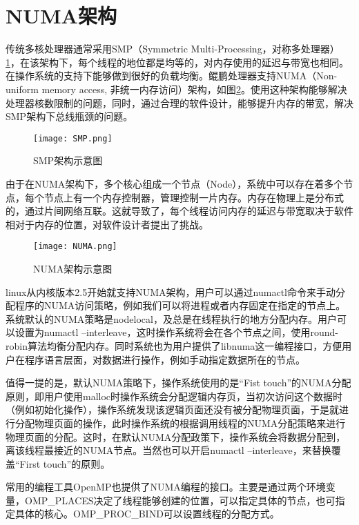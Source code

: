 \section{NUMA架构}

传统多核处理器通常采用SMP（Symmetric Multi-Processing，对称多处理器）\ref{SMP架构示意图}，在该架构下，每个线程的地位都是均等的，对内存使用的延迟与带宽也相同。在操作系统的支持下能够做到很好的负载均衡。鲲鹏处理器支持NUMA（Non-uniform memory access, 非统一内存访问）架构，如图\ref{NUMA架构示意图}。使用这种架构能够解决处理器核数限制的问题，同时，通过合理的软件设计，能够提升内存的带宽，解决SMP架构下总线瓶颈的问题。
\begin{figure}[htbp]
    \centering
    \texttt{[image: SMP.png]}
    \caption{SMP架构示意图}
    \label{SMP架构示意图}
\end{figure}

由于在NUMA架构下，多个核心组成一个节点（Node），系统中可以存在着多个节点，每个节点上有一个内存控制器，管理控制一片内存。内存在物理上是分布式的，通过片间网络互联。这就导致了，每个线程访问内存的延迟与带宽取决于软件相对于内存的位置，对软件设计者提出了挑战。

\begin{figure}[htbp]
    \centering
    \texttt{[image: NUMA.png]}
    \caption{NUMA架构示意图}
    \label{NUMA架构示意图}
\end{figure}

linux从内核版本2.5开始就支持NUMA架构\cite{numalinux}，用户可以通过numactl命令来手动分配程序的NUMA访问策略，例如我们可以将进程或者内存固定在指定的节点上。系统默认的NUMA策略是nodelocal，及总是在线程执行的地方分配内存。用户可以设置为numactl --interleave，这时操作系统将会在各个节点之间，使用round-robin算法均衡分配内存。同时系统也为用户提供了libnuma这一编程接口\cite{libnuma}，方便用户在程序语言层面，对数据进行操作，例如手动指定数据所在的节点。

值得一提的是，默认NUMA策略下，操作系统使用的是“Fist touch”的NUMA分配原则，即用户使用malloc时操作系统会分配逻辑内存页，当初次访问这个数据时（例如初始化操作），操作系统发现该逻辑页面还没有被分配物理页面，于是就进行分配物理页面的操作，此时操作系统的根据调用线程的NUMA分配策略来进行物理页面的分配。这时，在默认NUMA分配政策下，操作系统会将数据分配到，离该线程最接近的NUMA节点。当然也可以开启numactl --interleave，来替换覆盖“First touch”的原则。

常用的编程工具OpenMP也提供了NUMA编程的接口。主要是通过两个环境变量，OMP\_PLACES决定了线程能够创建的位置，可以指定具体的节点，也可指定具体的核心。OMP\_PROC\_BIND可以设置线程的分配方式。

